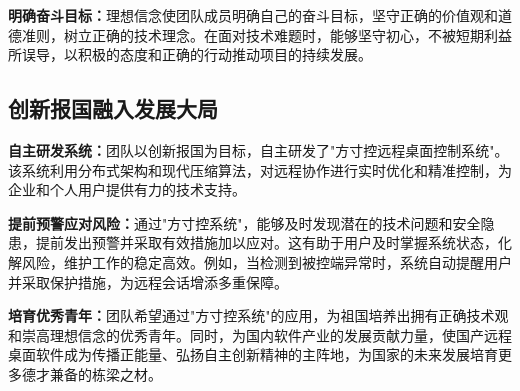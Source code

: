 \documentclass[12pt,a4paper]{article}
\begin{document}
\textbf{明确奋斗目标：}理想信念使团队成员明确自己的奋斗目标，坚守正确的价值观和道德准则，树立正确的技术理念。在面对技术难题时，能够坚守初心，不被短期利益所误导，以积极的态度和正确的行动推动项目的持续发展。

\subsection{创新报国融入发展大局}
\textbf{自主研发系统：}团队以创新报国为目标，自主研发了"方寸控远程桌面控制系统"。该系统利用分布式架构和现代压缩算法，对远程协作进行实时优化和精准控制，为企业和个人用户提供有力的技术支持。

\textbf{提前预警应对风险：}通过"方寸控系统"，能够及时发现潜在的技术问题和安全隐患，提前发出预警并采取有效措施加以应对。这有助于用户及时掌握系统状态，化解风险，维护工作的稳定高效。例如，当检测到被控端异常时，系统自动提醒用户并采取保护措施，为远程会话增添多重保障。

\textbf{培育优秀青年：}团队希望通过"方寸控系统"的应用，为祖国培养出拥有正确技术观和崇高理想信念的优秀青年。同时，为国内软件产业的发展贡献力量，使国产远程桌面软件成为传播正能量、弘扬自主创新精神的主阵地，为国家的未来发展培育更多德才兼备的栋梁之材。

\end{document}
